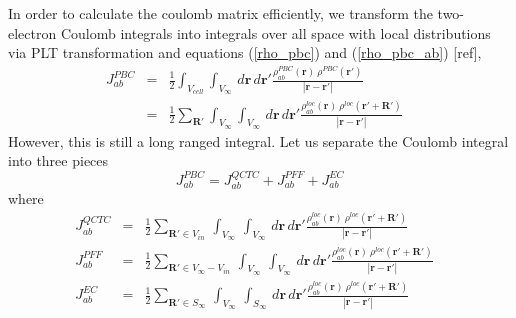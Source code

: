 \commentoutA{\documentclass[prb,aps,twocolumn,showpacs,twocolumngrid,superbib]{revtex4}}
\begin{document}
In order to calculate the coulomb matrix efficiently, we transform
the two-electron Coulomb integrals into integrals over all space with
local distributions via PLT transformation and equations (\ref{rho_pbc})
and (\ref{rho_pbc_ab}) {[}ref{]}, \begin{eqnarray}
J_{ab}^{PBC} & = & \frac{1}{2}\int _{V_{cell}}\int _{V_{\infty }}\, d{\mathbf{r}}\, d{\mathbf{r}'}\frac{\rho _{ab}^{PBC}\left( {\mathbf{r}}\right) \: \rho ^{PBC}\left( \mathbf{r}'\right) }{\left| \mathbf{r}-\mathbf{r}'\right| }\begin{array}{c}
\\

\end{array}\label{Jab_pbc1} \\
 & = & \frac{1}{2}\sum _{\mathbf{R}'}\int _{V_{\infty }}\int _{V_{\infty }}\, d{\mathbf{r}}\, d{\mathbf{r}'}\frac{\rho _{ab}^{loc}\left( {\mathbf{r}}\right) \: \rho ^{loc}\left( {\mathbf{r}'}+{\mathbf{R}'}\right) }{\left| \mathbf{r}-\mathbf{r}'\right| }\begin{array}{c}
\\

\end{array}\label{Jab_pbc2} 
\end{eqnarray}
However, this is still a long ranged integral. Let us separate the
Coulomb integral into three pieces \[
J_{ab}^{PBC}=J_{ab}^{QCTC}+J_{ab}^{PFF}+J_{ab}^{EC}\]
where \begin{eqnarray}
J_{ab}^{QCTC} & = & \frac{1}{2}\sum _{{\mathbf{R}'}\in V_{in}}\, \int _{V_{\infty }}\, \int _{V_{\infty }}\, d{\mathbf{r}}\, d{\mathbf{r}'}\frac{\rho ^{loc}_{ab}\left( {\mathbf{r}}\right) \: \rho ^{loc}\left( {\mathbf{r}'+\mathbf{R}'}\right) }{\left| \mathbf{r}-\mathbf{r}'\right| }\begin{array}{c}
\\

\end{array}\label{Jqctc} \\
J_{ab}^{PFF} & = & \frac{1}{2}\sum _{{\mathbf{R}'}\in V_{\infty }-V_{in}}\, \int _{V_{\infty }}\, \int _{V_{\infty }}\, d{\mathbf{r}}\, d{\mathbf{r}'}\frac{\rho _{ab}^{loc}\left( {\mathbf{r}}\right) \: \rho ^{loc}\left( {\mathbf{r}'+\mathbf{R}'}\right) }{\left| \mathbf{r}-\mathbf{r}'\right| }\begin{array}{c}
\\

\end{array}\label{Jpff} \\
J_{ab}^{EC} & = & \frac{1}{2}\sum _{{\mathbf{R}'}\in S_{\infty }}\, \int _{V_{\infty }}\, \int _{S_{\infty }}\, d{\mathbf{r}}\, d{\mathbf{r}'}\frac{\rho _{ab}^{loc}\left( {\mathbf{r}}\right) \: \rho ^{loc}\left( {\mathbf{r}'+\mathbf{R}'}\right) }{\left| \mathbf{r}-\mathbf{r}'\right| }\begin{array}{c}
\\

\end{array}\label{Jec} 
\end{eqnarray}
\end{document}
